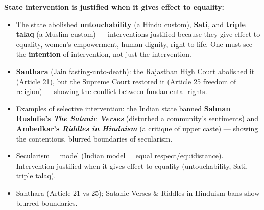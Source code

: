 \begin{DataFact}
\textbf{State intervention is justified when it gives effect to equality:}
\begin{itemize}
\item The state abolished \textbf{untouchability} (a Hindu custom), \textbf{Sati}, and \textbf{triple talaq} (a Muslim custom) --- interventions justified because they give effect to equality, women's empowerment, human dignity, right to life. One must see the \textbf{intention} of intervention, not just the intervention.
\item \textbf{Santhara} (Jain fasting-unto-death): the Rajasthan High Court abolished it (Article 21), but the Supreme Court restored it (Article 25 freedom of religion) --- showing the conflict between fundamental rights.
\item Examples of selective intervention: the Indian state banned \textbf{Salman Rushdie's \textit{The Satanic Verses}} (disturbed a community's sentiments) and \textbf{Ambedkar's \textit{Riddles in Hinduism}} (a critique of upper caste) --- showing the contentious, blurred boundaries of secularism.
\end{itemize}
\end{DataFact}

\begin{QuickRevision}
\begin{itemize}
\item Secularism = model (Indian model = equal respect/equidistance). Intervention justified when it gives effect to equality (untouchability, Sati, triple talaq).
\item Santhara (Article 21 vs 25); Satanic Verses \& Riddles in Hinduism bans show blurred boundaries.
\end{itemize}
\end{QuickRevision}